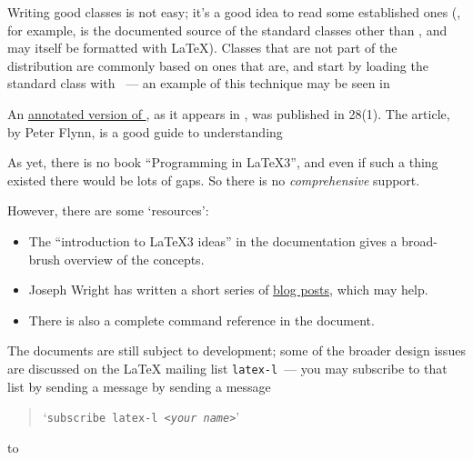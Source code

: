 Writing good classes is not easy; it's a good idea to read some
established ones (, for example, is the documented
source of the standard classes other than , and may
itself be formatted with \LaTeX{}).  Classes that are not part of the
distribution are commonly based on ones that are, and start by loading
the standard class with ~--- an example of this
technique may be seen in 

An %
\href{http://tug.org/TUGboat/Articles/tb28-1/tb88flynn.pdf}{annotated version of },
as it appears in , was published in
\TUGboat{} 28(1).  The article, by Peter Flynn, is a good guide to
understanding 
\begin{ctanrefs}
\item[classes.dtx]
\item[clsguide.pdf]
\item[latex-tds \nothtml{rmfamily}collection]
\item[ltxguide.cls]
\item[\nothtml{\rmfamily}\LaTeX{} documentation]
\item[source2e.tex]
\end{ctanrefs}

As yet, there is no book ``Programming in \LaTeX{}3'', and even if
such a thing existed there would be lots of gaps.  So there is no
\emph{comprehensive} support.

However, there are some `resources':
\begin{itemize}
\item The ``introduction to \LaTeX{}3 ideas'' in the 
  documentation gives a broad-brush overview of the concepts.
\item Joseph Wright has written a short series of %
  \href{http://www.texdev.net/index.php?s=programming+latex3}{blog posts},
  which may help.
\item There is also a complete command reference in the
   document.
\end{itemize}

The documents are still subject to development; some of the broader
design issues are discussed on the \LaTeX{} mailing list
\texttt{latex-l}~--- you may subscribe to that list by sending a
message by sending a message
\begin{quote}
  `\texttt{subscribe latex-l <\emph{your name}>}'
\end{quote}
to 
\begin{ctanrefs}
\item[expl3.pdf]
\item[interface3.pdf]
\end{ctanrefs}

